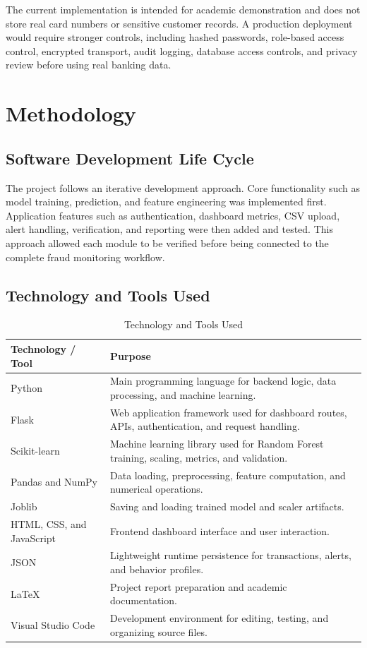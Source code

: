 \documentclass[12pt,a4paper]{report}
\begin{document}
The current implementation is intended for academic demonstration and does not store real card numbers or sensitive customer records. A production deployment would require stronger controls, including hashed passwords, role-based access control, encrypted transport, audit logging, database access controls, and privacy review before using real banking data.

\chapter{Methodology}

\section{Software Development Life Cycle}
The project follows an iterative development approach. Core functionality such as model training, prediction, and feature engineering was implemented first. Application features such as authentication, dashboard metrics, CSV upload, alert handling, verification, and reporting were then added and tested. This approach allowed each module to be verified before being connected to the complete fraud monitoring workflow.

\section{Technology and Tools Used}
\begin{table}[H]
\centering
\caption{Technology and Tools Used}
\begin{tabular}{p{} p{}}
\toprule
\textbf{Technology / Tool} & \textbf{Purpose} \\
\midrule
Python & Main programming language for backend logic, data processing, and machine learning. \\
Flask & Web application framework used for dashboard routes, APIs, authentication, and request handling. \\
Scikit-learn & Machine learning library used for Random Forest training, scaling, metrics, and validation. \\
Pandas and NumPy & Data loading, preprocessing, feature computation, and numerical operations. \\
Joblib & Saving and loading trained model and scaler artifacts. \\
HTML, CSS, and JavaScript & Frontend dashboard interface and user interaction. \\
JSON & Lightweight runtime persistence for transactions, alerts, and behavior profiles. \\
LaTeX & Project report preparation and academic documentation. \\
Visual Studio Code & Development environment for editing, testing, and organizing source files. \\
\bottomrule
\end{tabular}
\end{table}
\end{document}
